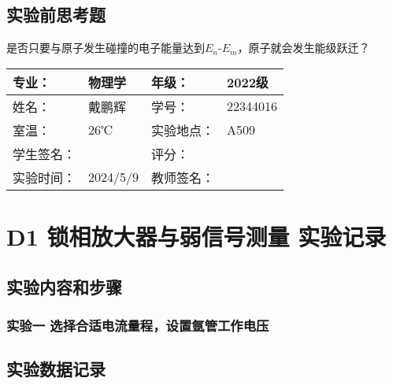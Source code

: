 \documentclass[dvipsnames, svgnames,a4paper,11pt]{article}
\begin{document}
	




\subsection{实验前思考题}

\begin{question}
	是否只要与原子发生碰撞的电子能量达到$E_n$-$E_m$，原子就会发生能级跃迁？
\end{question}

	









\clearpage
\begin{table}
	\renewcommand\arraystretch{1.7}
	\centering
	\begin{tabularx}{\textwidth}{|X|X|X|X|}
	\hline
	专业：& 物理学 &年级：& 2022级 \\
	\hline
	姓名：& 戴鹏辉 & 学号：& 22344016 \\
	\hline
	室温：& 26℃ & 实验地点： & A509 \\
	\hline
	学生签名：& & 评分： &\\
	\hline
	实验时间：& 2024/5/9 & 教师签名：&\\
	\hline
	\end{tabularx}
\end{table}

\section{D1 \quad 锁相放大器与弱信号测量 \quad\heiti 实验记录}
\subsection{实验内容和步骤}

	\subsubsection{实验一 \quad 选择合适电流量程，设置氩管工作电压}
	
		



\subsection{实验数据记录}

\end{document}
